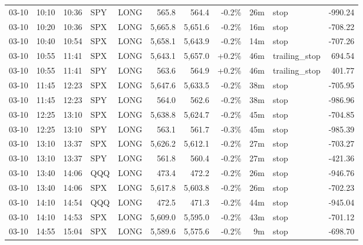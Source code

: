\documentclass[11pt,a4paper,twoside]{article}
\begin{document}
\begin{center}
\begin{longtable}{>{\color{txtmain}}l l l l l r r r r >{\color{txtmain}}l r}
03-10 & 10:10 & 10:36 & SPY & LONG & 565.8 & 564.4 & \textcolor{lossred}{-0.2\%} & 26m & stop & \textcolor{lossred}{-990.24} \\
03-10 & 10:20 & 10:36 & SPX & LONG & 5,665.8 & 5,651.6 & \textcolor{lossred}{-0.2\%} & 16m & stop & \textcolor{lossred}{-708.22} \\
03-10 & 10:40 & 10:54 & SPX & LONG & 5,658.1 & 5,643.9 & \textcolor{lossred}{-0.2\%} & 14m & stop & \textcolor{lossred}{-707.26} \\
03-10 & 10:55 & 11:41 & SPX & LONG & 5,643.1 & 5,657.0 & \textcolor{wingreen}{+0.2\%} & 46m & trailing\_stop & \textcolor{wingreen}{694.54} \\
03-10 & 10:55 & 11:41 & SPY & LONG & 563.6 & 564.9 & \textcolor{wingreen}{+0.2\%} & 46m & trailing\_stop & \textcolor{wingreen}{401.77} \\
03-10 & 11:45 & 12:23 & SPX & LONG & 5,647.6 & 5,633.5 & \textcolor{lossred}{-0.2\%} & 38m & stop & \textcolor{lossred}{-705.95} \\
03-10 & 11:45 & 12:23 & SPY & LONG & 564.0 & 562.6 & \textcolor{lossred}{-0.2\%} & 38m & stop & \textcolor{lossred}{-986.96} \\
03-10 & 12:25 & 13:10 & SPX & LONG & 5,638.8 & 5,624.7 & \textcolor{lossred}{-0.2\%} & 45m & stop & \textcolor{lossred}{-704.85} \\
03-10 & 12:25 & 13:10 & SPY & LONG & 563.1 & 561.7 & \textcolor{lossred}{-0.3\%} & 45m & stop & \textcolor{lossred}{-985.39} \\
03-10 & 13:10 & 13:37 & SPX & LONG & 5,626.2 & 5,612.1 & \textcolor{lossred}{-0.2\%} & 27m & stop & \textcolor{lossred}{-703.27} \\
03-10 & 13:10 & 13:37 & SPY & LONG & 561.8 & 560.4 & \textcolor{lossred}{-0.2\%} & 27m & stop & \textcolor{lossred}{-421.36} \\
03-10 & 13:40 & 14:06 & QQQ & LONG & 473.4 & 472.2 & \textcolor{lossred}{-0.2\%} & 26m & stop & \textcolor{lossred}{-946.76} \\
03-10 & 13:40 & 14:06 & SPX & LONG & 5,617.8 & 5,603.8 & \textcolor{lossred}{-0.2\%} & 26m & stop & \textcolor{lossred}{-702.23} \\
03-10 & 14:10 & 14:54 & QQQ & LONG & 472.5 & 471.3 & \textcolor{lossred}{-0.2\%} & 44m & stop & \textcolor{lossred}{-945.04} \\
03-10 & 14:10 & 14:53 & SPX & LONG & 5,609.0 & 5,595.0 & \textcolor{lossred}{-0.2\%} & 43m & stop & \textcolor{lossred}{-701.12} \\
03-10 & 14:55 & 15:04 & SPX & LONG & 5,589.6 & 5,575.6 & \textcolor{lossred}{-0.2\%} & 9m & stop & \textcolor{lossred}{-698.70} \\

\end{longtable}
\end{center}
\end{document}
